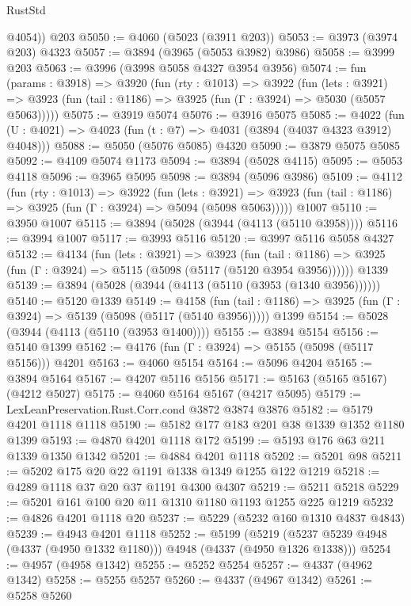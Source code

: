 \begin{lexlean}{RustStd}
\begin{coremodule}
{\begin{coremodule}
{{{{{{{{{{{{{{{{{{{{{{{{{{{{{{{{        @4054))
    @203
@5050 := @4060 (@5023 (@3911 @203))
@5053 := @3973 (@3974 @203) @4323
@5057 := @3894 (@3965 (@5053 @3982) @3986)
@5058 := @3999 @203
@5063 := @3996 (@3998 @5058 @4327 @3954 @3956)
@5074 := fun (params : @3918) =>
  @3920
    (fun (rty : @1013) =>
    @3922
      (fun (lets : @3921) =>
      @3923 (fun (tail : @1186) => @3925 (fun (Γ : @3924) => @5030 (@5057 @5063)))))
@5075 := @3919 @5074
@5076 := @3916 @5075
@5085 := @4022 (fun (U : @4021) => @4023 (fun (t : @7) => @4031 (@3894 (@4037 @4323 @3912) @4048)))
@5088 := @5050 (@5076 @5085) @4320
@5090 := @3879 @5075 @5085
@5092 := @4109 @5074 @1173
@5094 := @3894 (@5028 @4115)
@5095 := @5053 @4118
@5096 := @3965 @5095
@5098 := @3894 (@5096 @3986)
@5109 := @4112
    (fun (rty : @1013) =>
    @3922
      (fun (lets : @3921) =>
      @3923 (fun (tail : @1186) => @3925 (fun (Γ : @3924) => @5094 (@5098 @5063)))))
    @1007
@5110 := @3950 @1007
@5115 := @3894 (@5028 (@3944 (@4113 (@5110 @3958))))
@5116 := @3994 @1007
@5117 := @3993 @5116
@5120 := @3997 @5116 @5058 @4327
@5132 := @4134
    (fun (lets : @3921) =>
    @3923
      (fun (tail : @1186) => @3925 (fun (Γ : @3924) => @5115 (@5098 (@5117 (@5120 @3954 @3956))))))
    @1339
@5139 := @3894 (@5028 (@3944 (@4113 (@5110 (@3953 (@1340 @3956))))))
@5140 := @5120 @1339
@5149 := @4158
    (fun (tail : @1186) => @3925 (fun (Γ : @3924) => @5139 (@5098 (@5117 (@5140 @3956)))))
    @1399
@5154 := @5028 (@3944 (@4113 (@5110 (@3953 @1400))))
@5155 := @3894 @5154
@5156 := @5140 @1399
@5162 := @4176 (fun (Γ : @3924) => @5155 (@5098 (@5117 @5156))) @4201
@5163 := @4060 @5154
@5164 := @5096 @4204
@5165 := @3894 @5164
@5167 := @4207 @5116 @5156
@5171 := @5163 (@5165 @5167) (@4212 @5027)
@5175 := @4060 @5164 @5167 (@4217 @5095)
@5179 := LexLeanPreservation.Rust.Corr.cond @3872 @3874 @3876
@5182 := @5179 @4201 @1118 @1118
@5190 := @5182 @177 @183 @201 @38 @1339 @1352 @1180 @1399
@5193 := @4870 @4201 @1118 @172
@5199 := @5193 @176 @63 @211 @1339 @1350 @1342
@5201 := @4884 @4201 @1118
@5202 := @5201 @98
@5211 := @5202 @175 @20 @22 @1191 @1338 @1349 @1255 @122 @1219
@5218 := @4289 @1118 @37 @20 @37 @1191 @4300 @4307
@5219 := @5211 @5218
@5229 := @5201 @161 @100 @20 @11 @1310 @1180 @1193 @1255 @225 @1219
@5232 := @4826 @4201 @1118 @20
@5237 := @5229 (@5232 @160 @1310 @4837 @4843)
@5239 := @4943 @4201 @1118
@5252 := @5199
    (@5219 (@5237 @5239 @4948 (@4337 (@4950 @1332 @1180))) @4948 (@4337 (@4950 @1326 @1338)))
@5254 := @4957 (@4958 @1342)
@5255 := @5252 @5254
@5257 := @4337 (@4962 @1342)
@5258 := @5255 @5257
@5260 := @4337 (@4967 @1342)
@5261 := @5258 @5260
}}}}}}}}}}}}}}}}}}}}}}}}}}}}}}}}
\end{coremodule}}
\end{coremodule}
\end{lexlean}

